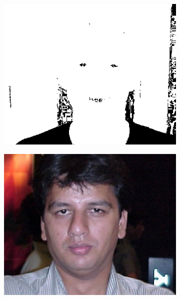 \begin{figure}[h]
    \hfill
     \begin{subfigure}[b]{0.3\textwidth}
         \centering
         \includegraphics[width=\textwidth]{images/introduction/im00060p.png}
         \label{fig:thresh-wood-p}
     \end{subfigure}
     \begin{subfigure}[b]{0.3\textwidth}
         \centering
         \includegraphics[width=\textwidth]{images/introduction/im00081x.jpg}
         \caption{}
         \label{fig:thresh-color-x}
     \end{subfigure}

\end{figure}
